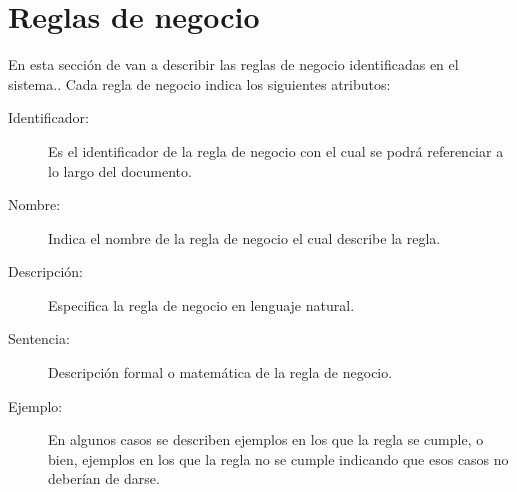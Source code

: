 \clearpage
\chapter{Reglas de negocio}
                                             
En esta sección de van a describir las reglas de negocio identificadas en el sistema..
Cada regla de negocio indica los siguientes atributos:

\begin{description}
	\item[Identificador:] Es el identificador de la regla de negocio con el cual se podrá referenciar a lo largo del documento.
	\item[Nombre:] Indica el nombre de la regla de negocio el cual describe la regla.
	\item[Descripción:] Especifica la regla de negocio en lenguaje natural.
	
	\item[Sentencia:] Descripción formal o matemática de la regla de negocio.
	\item[Ejemplo:] En algunos casos se describen ejemplos en los que la regla se cumple, o bien, ejemplos en los que la regla no se cumple indicando que esos casos no deberían de darse.
\end{description}

